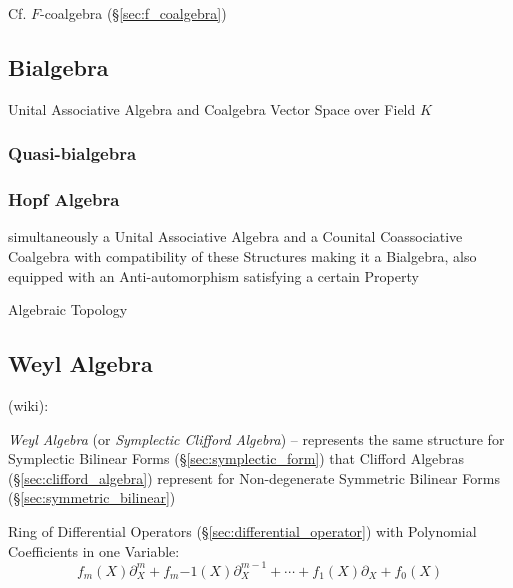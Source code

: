 Cf. $F$-coalgebra (\S\ref{sec:f_coalgebra})



\subsection{Bialgebra}\label{sec:bialgebra}

Unital Associative Algebra and Coalgebra Vector Space over Field $K$



\subsubsection{Quasi-bialgebra}\label{sec:quasi_bialgebra}

\subsubsection{Hopf Algebra}\label{sec:hopf_algebra}

simultaneously a Unital Associative Algebra and a Counital
Coassociative Coalgebra with compatibility of these Structures making
it a Bialgebra, also equipped with an Anti-automorphism satisfying a
certain Property %

Algebraic Topology



\subsection{Weyl Algebra}\label{sec:weyl_algebra}

(wiki):

\emph{Weyl Algebra} (or \emph{Symplectic Clifford Algebra}) -- represents the
same structure for Symplectic Bilinear Forms (\S\ref{sec:symplectic_form}) that
Clifford Algebras (\S\ref{sec:clifford_algebra}) represent for Non-degenerate
Symmetric Bilinear Forms (\S\ref{sec:symmetric_bilinear})

Ring of Differential Operators (\S\ref{sec:differential_operator}) with
Polynomial Coefficients in one Variable:
\[
  f_m(X)\partial^m_X + f_m{-1}(X)\partial^{m-1}_X + \cdots +
  f_1(X)\partial_X + f_0(X)
\]

